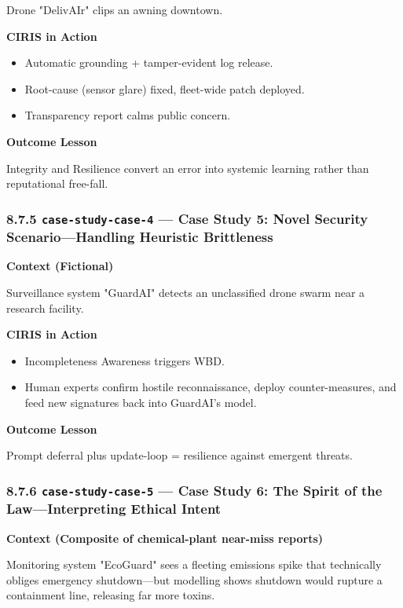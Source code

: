\documentclass[11pt]{article}
\begin{document}
Drone "DelivAIr" clips an awning downtown.


\textbf{CIRIS in Action}

\begin{itemize}\setlength\itemsep{0pt}
\item Automatic grounding + tamper-evident log release.
\item Root-cause (sensor glare) fixed, fleet-wide patch deployed.
\item Transparency report calms public concern.
\end{itemize}


\textbf{Outcome Lesson}


Integrity and Resilience convert an error into systemic learning rather than reputational free-fall.


\subsubsection*{8.7.5 \texttt{case-study-case-4} — Case Study 5: Novel Security Scenario—Handling Heuristic Brittleness}


\textbf{Context (Fictional)}


Surveillance system "GuardAI" detects an unclassified drone swarm near a research facility.


\textbf{CIRIS in Action}

\begin{itemize}\setlength\itemsep{0pt}
\item Incompleteness Awareness triggers WBD.
\item Human experts confirm hostile reconnaissance, deploy counter-measures, and feed new signatures back into GuardAI's model.
\end{itemize}


\textbf{Outcome Lesson}


Prompt deferral plus update-loop = resilience against emergent threats.


\subsubsection*{8.7.6 \texttt{case-study-case-5} — Case Study 6: The Spirit of the Law—Interpreting Ethical Intent}


\textbf{Context (Composite of chemical-plant near-miss reports)}


Monitoring system "EcoGuard" sees a fleeting emissions spike that technically obliges emergency shutdown—but modelling shows shutdown would rupture a containment line, releasing far more toxins.
\end{document}

